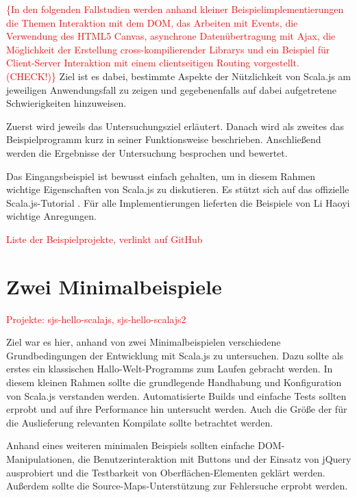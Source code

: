 \documentclass[a4paper, 12pt, hidelinks, listof=totoc, listoftables=totoc, bibliography=totoc]{scrreprt}
\newcommand{\TODO}[1]{\textcolor{red}{#1}\newline}
\newcommand{\TODOi}[1]{\textcolor{red}{\{#1\}}}
\begin{document}
\TODOi{In den folgenden Fallstudien werden anhand kleiner Beispielimplementierungen die Themen Interaktion mit dem \ac{DOM}, das Arbeiten mit Events, die Verwendung des HTML5 Canvas, asynchrone Datenübertragung mit Ajax, die Möglichkeit der Erstellung cross-kompilierender Librarys und ein Beispiel für Client-Server Interaktion mit einem clientseitigen Routing vorgestellt. (CHECK!)} Ziel ist es dabei, bestimmte Aspekte der Nützlichkeit von Scala.js am jeweiligen Anwendungsfall zu zeigen und gegebenenfalls auf dabei aufgetretene Schwierigkeiten hinzuweisen.

Zuerst wird jeweils das Untersuchungsziel erläutert. Danach wird als zweites das Beispielprogramm kurz in seiner Funktionsweise beschrieben. Anschließend werden die Ergebnisse der Untersuchung besprochen und bewertet.

Das Eingangsbeispiel ist bewusst einfach gehalten, um in diesem Rahmen wichtige Eigenschaften von Scala.js zu diskutieren. Es stützt sich auf das offizielle Scala.js-Tutorial \cite{scalajs.SJT}. Für alle Implementierungen lieferten die Beispiele von Li Haoyi \cite{haoyi.HOS} wichtige Anregungen.

\TODO{Liste der Beispielprojekte, verlinkt auf GitHub}




\section{Zwei Minimalbeispiele}


\TODO{Projekte: sjs-hello-scalajs, sjs-hello-scalajs2}

Ziel war es hier, anhand von zwei Minimalbeispielen verschiedene Grundbedingungen der Entwicklung mit Scala.js zu untersuchen. Dazu sollte als erstes ein klassischen Hallo-Welt-Programms zum Laufen gebracht werden. In diesem kleinen Rahmen sollte die grundlegende Handhabung und Konfiguration von Scala.js verstanden werden. Automatisierte Builds und einfache Tests sollten erprobt und auf ihre Performance hin untersucht werden. Auch die Größe der für die Auslieferung relevanten Kompilate sollte betrachtet werden.

Anhand eines weiteren minimalen Beispiels sollten einfache \ac{DOM}-Manipulationen, die Benutzerinteraktion mit Buttons und der Einsatz von jQuery ausprobiert und die Testbarkeit von Oberflächen-Elementen geklärt werden. Außerdem sollte die Source-Maps-Unterstützung zur Fehlersuche erprobt werden.
\end{document}

